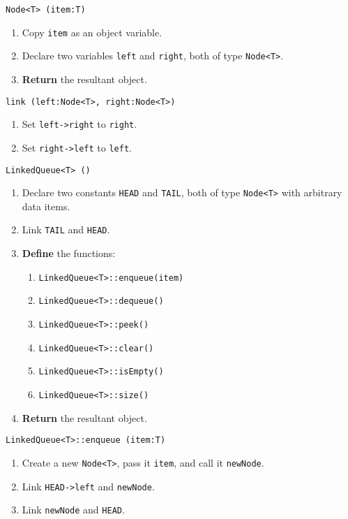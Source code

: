 \algorithm
\texttt{Node<T> (item:T)}
\begin{enumerate}
	\item Copy \texttt{item} as an object variable.
	\item Declare two variables \texttt{left} and \texttt{right}, both of type \texttt{Node<T>}.
	\item \textbf{Return} the resultant object.
\end{enumerate}
\vspace{5mm}
\texttt{link (left:Node<T>, right:Node<T>)}
\begin{enumerate}
	\item Set \texttt{left->right} to \texttt{right}.
	\item Set \texttt{right->left} to \texttt{left}.
\end{enumerate}
\vspace{8mm}
\texttt{LinkedQueue<T> ()}
\begin{enumerate}
	\item Declare two constants \texttt{HEAD} and \texttt{TAIL}, both of type \texttt{Node<T>} with
		arbitrary data items.
	\item Link \texttt{TAIL} and \texttt{HEAD}.
	\item \textbf{Define} the functions:
	\begin{enumerate}
		\item \texttt{LinkedQueue<T>::enqueue(item)} 
		\item \texttt{LinkedQueue<T>::dequeue()}
		\item \texttt{LinkedQueue<T>::peek()}
		\item \texttt{LinkedQueue<T>::clear()} 
		\item \texttt{LinkedQueue<T>::isEmpty()}
		\item \texttt{LinkedQueue<T>::size()}
	\end{enumerate}
	\item \textbf{Return} the resultant object.
\end{enumerate}
\vspace{5mm}
\texttt{LinkedQueue<T>::enqueue (item:T)}
\begin{enumerate}
	\item Create a new \texttt{Node<T>}, pass it \texttt{item}, and call it \texttt{newNode}.
	\item Link \texttt{HEAD->left} and \texttt{newNode}. 
	\item Link \texttt{newNode} and \texttt{HEAD}. 
\end{enumerate}
\vspace{5mm}
